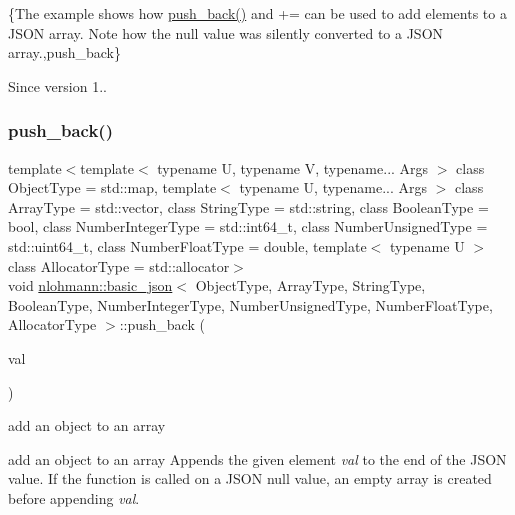 \{The example shows how {\ttfamily \hyperlink{classnlohmann_1_1basic__json_a486b96adbf4886c38e38c952394a220f}{push\+\_\+back()}} and {\ttfamily +=} can be used to add elements to a J\+S\+ON array. Note how the {\ttfamily null} value was silently converted to a J\+S\+ON array.,push\+\_\+back\}

\begin{DoxySince}{Since}
version 1.. 
\end{DoxySince}
\hypertarget{classnlohmann_1_1basic__json_a6f3dfd3e83a1e907d7946b47fcd7ceba}{}\label{classnlohmann_1_1basic__json_a6f3dfd3e83a1e907d7946b47fcd7ceba} 
\subsubsection{\texorpdfstring{push\+\_\+back()}{push\_back()}\hspace{0.1cm}{\footnotesize\ttfamily [2/4]}}
{\footnotesize\ttfamily template$<$template$<$ typename U, typename V, typename... Args $>$ class Object\+Type = std\+::map, template$<$ typename U, typename... Args $>$ class Array\+Type = std\+::vector, class String\+Type  = std\+::string, class Boolean\+Type  = bool, class Number\+Integer\+Type  = std\+::int64\+\_\+t, class Number\+Unsigned\+Type  = std\+::uint64\+\_\+t, class Number\+Float\+Type  = double, template$<$ typename U $>$ class Allocator\+Type = std\+::allocator$>$ \\
void \hyperlink{classnlohmann_1_1basic__json}{nlohmann\+::basic\+\_\+json}$<$ Object\+Type, Array\+Type, String\+Type, Boolean\+Type, Number\+Integer\+Type, Number\+Unsigned\+Type, Number\+Float\+Type, Allocator\+Type $>$\+::push\+\_\+back (\begin{DoxyParamCaption}\item[{const \hyperlink{classnlohmann_1_1basic__json}{basic\+\_\+json}$<$ Object\+Type, Array\+Type, String\+Type, Boolean\+Type, Number\+Integer\+Type, Number\+Unsigned\+Type, Number\+Float\+Type, Allocator\+Type $>$ \&}]{val }\end{DoxyParamCaption})\hspace{0.3cm}{\ttfamily [inline]}}



add an object to an array 

add an object to an array Appends the given element {\itshape val} to the end of the J\+S\+ON value. If the function is called on a J\+S\+ON null value, an empty array is created before appending {\itshape val}.



